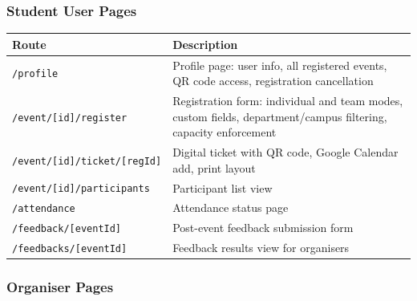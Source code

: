 \documentclass[12pt,a4paper]{article}
\begin{document}
\subsubsection{Student User Pages}

\begin{tabularx}{\textwidth}{L{5cm} X}
\toprule
{}
\textbf{Route} & \textbf{Description} \\
\midrule
\texttt{/profile} & Profile page: user info, all registered events, QR code access, registration cancellation \\
\texttt{/event/[id]/register} & Registration form: individual and team modes, custom fields, department/campus filtering, capacity enforcement \\
\texttt{/event/[id]/ticket/[regId]} & Digital ticket with QR code, Google Calendar add, print layout \\
\texttt{/event/[id]/participants} & Participant list view \\
\texttt{/attendance} & Attendance status page \\
\texttt{/feedback/[eventId]} & Post-event feedback submission form \\
\texttt{/feedbacks/[eventId]} & Feedback results view for organisers \\
\bottomrule
\end{tabularx}

\subsubsection{Organiser Pages}
\end{document}
